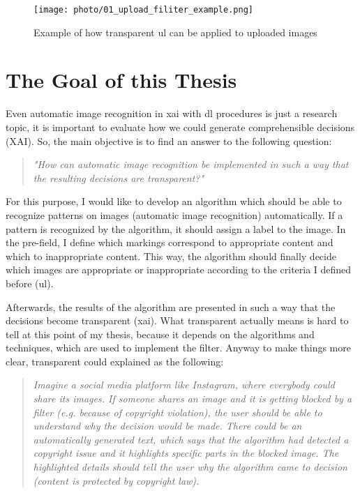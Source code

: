 \begin{figure}[!htp]
	\centering
	\texttt{[image: photo/01\_upload\_filiter\_example.png]}
	\caption{Example of how transparent \gls{ul} can be applied to uploaded images \cite{Visualiz76:online}}
	\label{fig:01_upload_filiter_example}
\end{figure}

\section{The Goal of this Thesis}
\label{sec:goal}

Even automatic image recognition in \gls{xai} with \gls{dl} procedures is just a research topic, it is important to evaluate how we could generate comprehensible decisions (XAI). So, the main objective is to find an answer to the following question:
\begin{quote}\textit{"How can automatic image recognition be implemented in such a way that the resulting decisions are transparent?"} \end{quote}
For this purpose, I would like to develop an algorithm which should be able to recognize patterns on images (automatic image recognition) automatically. If a pattern is recognized by the algorithm, it should assign a label to the image.  In the pre-field, I define which markings correspond to appropriate content and which to inappropriate content. This way, the algorithm should finally decide which images are appropriate or inappropriate according to the criteria I defined before (\gls{ul}).

Afterwards, the results of the algorithm are presented in such a way that the decisions become transparent (\gls{xai}). What transparent actually means is hard to tell at this point of my thesis, because it depends on the algorithms and techniques, which are used to implement the filter. Anyway to make things more clear, transparent could explained as the following:

\begin{quote}
\textit{Imagine a social media platform like Instagram, where everybody could share its images. If someone shares an image and it is getting blocked by a filter (e.g. because of copyright violation), the user should be able to understand why the decision would be made. There could be an automatically generated text, which says that the algorithm had detected a copyright issue and it highlights specific parts in the blocked image. The highlighted details should tell the user why the algorithm came to decision (content is protected by copyright law).
}

\end{quote}

